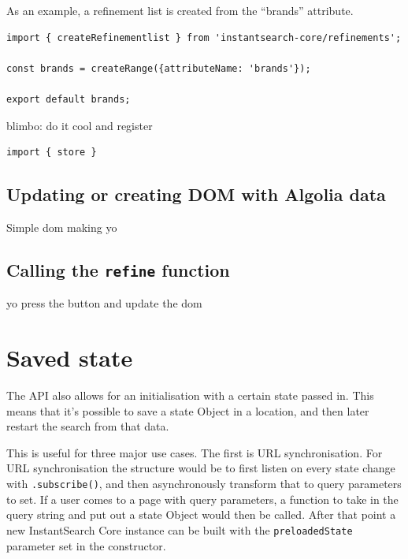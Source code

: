 As an example, a refinement list is created from the ``brands'' attribute. %

\begin{minipage}{\linewidth}
\begin{lstlisting}[caption={Creating a refinement},label={lst:creating-refinement}]
import { createRefinementlist } from 'instantsearch-core/refinements';

const brands = createRange({attributeName: 'brands'});

export default brands;
\end{lstlisting}
\end{minipage}

blimbo: do it cool and register %

\begin{minipage}{\linewidth}
\begin{lstlisting}[caption={Registering a refinement},label={lst:registering-refinement}]
import { store } 
\end{lstlisting}
\end{minipage}

\subsection{Updating or creating DOM with Algolia data}
\label{subs:data_to_dom}

Simple dom making yo %

\subsection{Calling the {\tt refine} function}
\label{subs:refining}

yo press the button and update the dom %


\section{Saved state} %
\label{sec:saved_state}

The API also allows for an initialisation with a certain state passed in. This means that it's possible to save a state Object in a location, and then later restart the search from that data. 

This is useful for three major use cases. The first is URL synchronisation. For URL synchronisation the structure would be to first listen on every state change with {\tt .subscribe()}, and then asynchronously transform that to query parameters to set. If a user comes to a page with query parameters, a function to take in the query string and put out a state Object would then be called. After that point a new InstantSearch Core instance can be built with the {\tt preloadedState} parameter set in the constructor.

